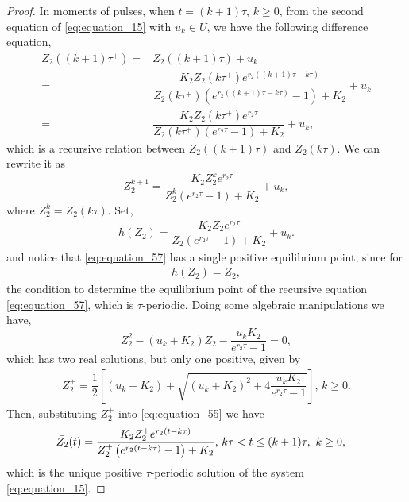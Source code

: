 \documentclass[10pt,letterpaper]{article}
\begin{document}
\begin{proof}
In moments of pulses, when $t = (k+1)\tau$, $k \geq 0$, from the second equation of \eqref{eq:equation_15} with $u_k \in U$, we have the following difference equation, 
\begin{eqnarray}\label{eq:equation_56}\nonumber
    Z_2((k+1)\tau^+) = & Z_2((k+1)\tau) + u_k\\
    = &\dfrac{K_2 Z_2(k\tau^+) e^{r_2 ((k+1)\tau-k\tau)}}{Z_2(k\tau^+)\left(e^{r_2 ((k+1)\tau-k\tau)} -1\right)+K_2} + u_k\\\nonumber
    = &\dfrac{K_2 Z_2(k\tau^+) e^{r_2 \tau}}{Z_2(k\tau^+)\left(e^{r_2 \tau} -1\right)+K_2} + u_k, \nonumber
\end{eqnarray}
which is a recursive relation between $Z_2((k+1)\tau)$ and $Z_2(k\tau)$. We can rewrite it as
\begin{equation}\label{eq:equation_57}
    Z_2^{k+1} = \dfrac{K_2 Z_2^k e^{r_2 \tau}}{Z_2^k\left(e^{r_2 \tau} -1\right)+K_2} + u_k,
\end{equation}where $Z_2^k = Z_2(k \tau)$.
Set, \begin{align}
    h(Z_2) = \dfrac{K_2 Z_2 e^{r_2 \tau}}{Z_2\left(e^{r_2 \tau} -1\right)+K_2} + u_k.
\end{align}and notice that \eqref{eq:equation_57} has a single positive equilibrium point, since for 
\begin{align}\label{eq:equation_58}
    h(Z_2) = Z_2,
\end{align}
the condition to determine the equilibrium point of the recursive equation \eqref{eq:equation_57}, which is $\tau$-periodic. Doing some algebraic manipulations we have,
\begin{equation}\label{eq:equation_59}
    Z_2^2-(u_k+K_2)Z_2-\dfrac{u_kK_2}{e^{r_2 \tau}-1} = 0,
\end{equation}
which has two real solutions, but only one positive, given by
\begin{align}\label{eq:equation_60}
    Z_2^{+} = \dfrac{1}{2}\left[(u_k+K_2)+\sqrt{(u_k+K_2)^2+4\dfrac{u_kK_2}{e^{r_2 \tau}-1}}\right], \,k \geq 0.
\end{align}Then, substituting $Z_2^+$ into \eqref{eq:equation_55} we have  
\begin{align}\label{eq:equation_61}
    \Bar{Z_2}(t) &= \dfrac{K_2 Z_2^+ e^{r_2 (t-k\tau)}}{Z_2^+\left(e^{r_2 (t-k\tau)} -1\right)+K_2} \mbox{, }  k\tau < t \leq (k+1)\tau, \mbox{ }k \geq 0,
\end{align}which is the unique positive $\tau$-periodic solution of the system \eqref{eq:equation_15}.


\end{proof}
\end{document}
